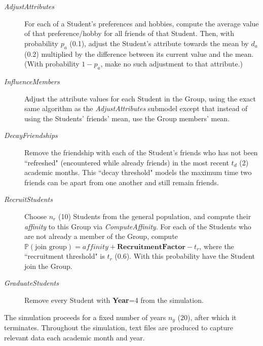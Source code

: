 \begin{description}
\item[\textsl{AdjustAttributes}] For each of a Student's preferences and
hobbies, compute the average value of that preference/hobby for all friends of
that Student. Then, with probability $p_a$ (0.1), adjust the Student's
attribute towards the mean by $d_a$ (0.2) multiplied by the difference between its current
value and the mean. (With probability $1-p_a$, make no such adjustment to that
attribute.)

\item[\textsl{InfluenceMembers}] Adjust the attribute values for each Student
in the Group, using the exact same algorithm as the \textsl{AdjustAttributes}
submodel except that instead of using the Students' friends' mean, use the
Group members' mean.

\item[\textsl{DecayFriendships}] Remove the friendship with each of the
Student's friends who has not been ``refreshed" (encountered while already
friends) in the most recent $t_d$ (2) academic months. This ``decay threshold"
models the maximum time two friends can be apart from one another and still
remain friends.

\item[\textsl{RecruitStudents}] Choose $n_r$ (10) Students from the general
population, and compute their \textit{affinity} to this Group via
\textsl{ComputeAffinity}. For each of the Students who are not already a
member of the Group, compute $\mathbb{P}(\text{join group})= \textit{affinity}
+ \textbf{RecruitmentFactor} - t_r$, where the ``recruitment threshold" is $t_r$ (0.6). 
With this probability have the Student join the Group.

\item[\textsl{GraduateStudents}] Remove every Student with \textbf{Year}=4 from the
simulation.

\end{description}

The simulation proceeds for a fixed number of years $n_y$ (20), after which it terminates.
Throughout the simulation, text files are produced to capture relevant data
each academic month and year.

